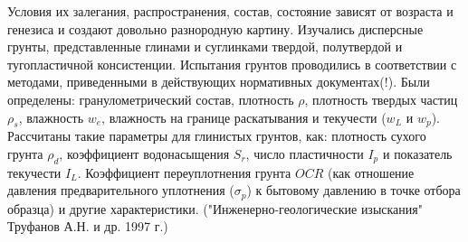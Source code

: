 Условия их залегания, распространения, состав, состояние зависят от возраста и генезиса и создают довольно разнородную картину. Изучались дисперсные грунты, представленные глинами и суглинками твердой, полутвердой и тугопластичной консистенции. Испытания грунтов проводились в соответствии с методами, приведенными в действующих нормативных документах(!). Были определены: гранулометрический состав, плотность $\rho$, плотность твердых частиц $\rho_s$, влажность $w_e$, влажность на границе раскатывания и текучести ($w_L$ и $w_p$). Рассчитаны такие параметры для глинистых грунтов, как: плотность сухого грунта $\rho_d$,  коэффициент водонасыщения $S_r$, число пластичности $I_p$ и показатель текучести $I_L$. Коэффициент переуплотнения грунта $OCR$ (как отношение давления предварительного уплотнения ($\sigma_p$) к бытовому давлению в точке отбора образца) и другие характеристики. ("Инженерно-геологические изыскания" Труфанов А.Н. и др. 1997 г.)